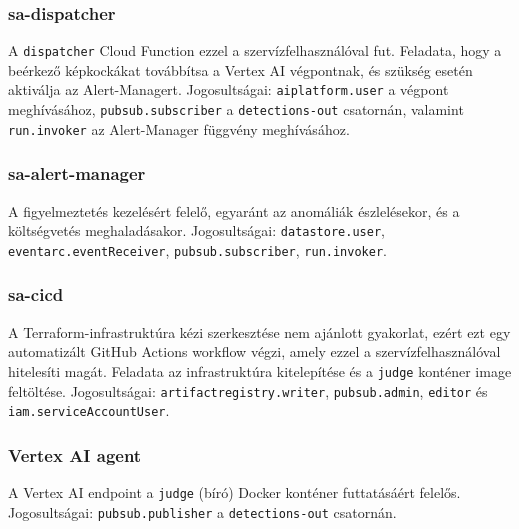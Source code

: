             \subsubsection{sa-dispatcher}
            \begin{sloppypar}
            A \texttt{dispatcher} Cloud Function ezzel a szervízfelhasználóval fut. Feladata, hogy a beérkező képkockákat továbbítsa
            a Vertex AI végpontnak, és szükség esetén aktiválja az Alert-Managert. Jogosultságai: \texttt{aiplatform.user} a végpont
            meghívásához, \texttt{pubsub.subscriber} a \texttt{detections-out} csatornán, valamint \texttt{run.invoker} az Alert-Manager
            függvény meghívásához.
            \end{sloppypar}

            \subsubsection{sa-alert-manager}
            \begin{sloppypar}
            A figyelmeztetés kezelésért felelő, egyaránt az anomáliák észlelésekor, és a költségvetés meghaladásakor. Jogosultságai: \texttt{datastore.user},
            \texttt{eventarc.eventReceiver}, \texttt{pubsub.subscriber}, \texttt{run.invoker}.
            \end{sloppypar}

            \subsubsection{sa-cicd}
            \begin{sloppypar}
            A Terraform-infrastruktúra kézi szerkesztése nem ajánlott gyakorlat, ezért ezt egy automatizált GitHub Actions workflow végzi,
            amely ezzel a szervízfelhasználóval hitelesíti magát. Feladata az infrastruktúra kitelepítése és a \texttt{judge} konténer image
            feltöltése. Jogosultságai: \texttt{artifactregistry.writer}, \texttt{pubsub.admin}, \texttt{editor} és \texttt{iam.serviceAccountUser}.
            \end{sloppypar}
            \subsubsection{Vertex AI agent}
            \begin{sloppypar}
            A Vertex AI endpoint a \texttt{judge} (bíró) Docker konténer futtatásáért felelős. Jogosultságai:
            \texttt{pubsub.publisher} a \texttt{detections-out} csatornán.
            \end{sloppypar}

